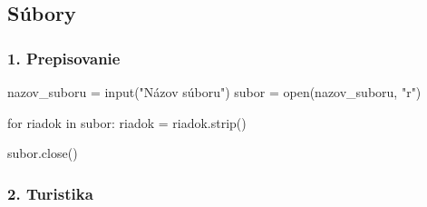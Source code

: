 \subsection{Súbory}

\subsubsection*{1. Prepisovanie}
\begin{solution}
nazov_suboru = input("Názov súboru")
subor = open(nazov_suboru, "r")

for riadok in subor:
    riadok = riadok.strip()

subor.close()
\end{solution}

\subsubsection*{2. Turistika}
